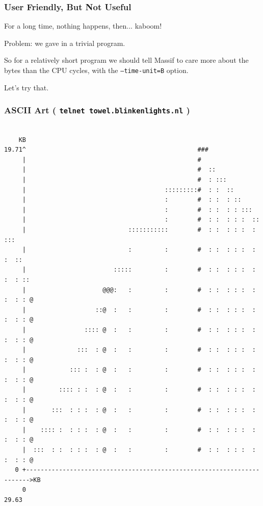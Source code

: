 \begin{frame}
\frametitle{User Friendly, But Not Useful}

For a long time, nothing happens, then... kaboom! 

Problem: we gave in a trivial program.

So for a relatively short program we should tell Massif to care more about the bytes than the CPU cycles, with the \texttt{--time-unit=B} option. 

Let's try that.



\end{frame}

\begin{frame}[fragile]
\frametitle{ASCII Art ( \texttt{telnet towel.blinkenlights.nl} )}

{\scriptsize
\begin{verbatim}

    KB
19.71^                                               ###                      
     |                                               #                        
     |                                               #  ::                    
     |                                               #  : :::                 
     |                                      :::::::::#  : :  ::               
     |                                      :        #  : :  : ::             
     |                                      :        #  : :  : : :::          
     |                                      :        #  : :  : : :  ::        
     |                            :::::::::::        #  : :  : : :  : :::     
     |                            :         :        #  : :  : : :  : :  ::   
     |                        :::::         :        #  : :  : : :  : :  : :: 
     |                     @@@:   :         :        #  : :  : : :  : :  : : @
     |                   ::@  :   :         :        #  : :  : : :  : :  : : @
     |                :::: @  :   :         :        #  : :  : : :  : :  : : @
     |              :::  : @  :   :         :        #  : :  : : :  : :  : : @
     |            ::: :  : @  :   :         :        #  : :  : : :  : :  : : @
     |         :::: : :  : @  :   :         :        #  : :  : : :  : :  : : @
     |       :::  : : :  : @  :   :         :        #  : :  : : :  : :  : : @
     |    :::: :  : : :  : @  :   :         :        #  : :  : : :  : :  : : @
     |  :::  : :  : : :  : @  :   :         :        #  : :  : : :  : :  : : @
   0 +----------------------------------------------------------------------->KB
     0                                                                   29.63

\end{verbatim}
}

\end{frame}



